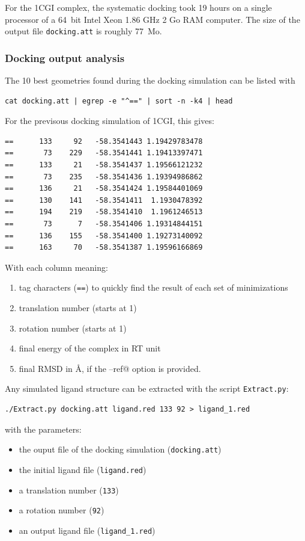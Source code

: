\documentclass[12pt,a4paper]{article}
\begin{document}
For the 1CGI complex, the systematic docking took 19 hours on a single processor of a 64~bit Intel Xeon 1.86 GHz 2 Go RAM computer.
The size of the output file {\tt docking.att} is roughly 77~Mo.

\subsubsection{Docking output analysis}

The 10 best geometries found during the docking simulation can be listed with

\begin{verbatim}
cat docking.att | egrep -e "^==" | sort -n -k4 | head
\end{verbatim}

For the previsous docking simulation of 1CGI, this gives:

\begin{verbatim}
==      133     92   -58.3541443 1.19429783478
==       73    229   -58.3541441 1.19413397471
==      133     21   -58.3541437 1.19566121232
==       73    235   -58.3541436 1.19394986862
==      136     21   -58.3541424 1.19584401069
==      130    141   -58.3541411  1.1930478392
==      194    219   -58.3541410  1.1961246513
==       73      7   -58.3541406 1.19314844151
==      136    155   -58.3541400 1.19273140092
==      163     70   -58.3541387 1.19596166869
\end{verbatim}

With each column meaning:
\begin{enumerate}
\item tag characters ({\tt ==}) to quickly find the result of each set of minimizations
\item translation number (starts at 1)
\item rotation number (starts at 1)
\item final energy of the complex in RT unit
\item final RMSD in \AA, if the \verb@--ref@ option is provided.
\end{enumerate}

Any simulated ligand structure can be extracted with the script {\tt Extract.py}:

\begin{verbatim}
./Extract.py docking.att ligand.red 133 92 > ligand_1.red
\end{verbatim}

with the parameters:
\begin{itemize}
\item the ouput file of the docking simulation ({\tt docking.att})
\item the initial ligand file ({\tt ligand.red})
\item a translation number ({\tt 133})
\item a rotation number ({\tt 92})
\item an output ligand file ({\tt ligand\_1.red})
\end{itemize}
\end{document}
